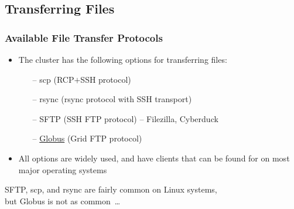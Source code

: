 \subsection{Transferring Files}
\begin{frame}
	\frametitle{Available File Transfer Protocols}
	\begin{itemize}
		\item The cluster has the following options for transferring files:
		\begin{itemize}
			\item[--] scp (RCP$+$SSH protocol)
			\item[--] rsync (rsync protocol with SSH transport)
			\item[--] SFTP (SSH FTP protocol) -- Filezilla, Cyberduck
			\item[--] \href{https://www.globus.org/}{Globus} (Grid FTP protocol)
		\end{itemize}
		\item All options are widely used, and have clients that can be found for on most major operating systems
	\end{itemize}
	\btVFill
	\begin{center}
		SFTP, scp, and rsync are fairly common on Linux systems,~\\but Globus is not as common~\ldots
	\end{center}
	
\end{frame}


